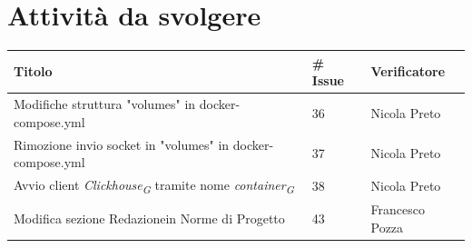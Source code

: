 \documentclass{article}
\begin{document}
\section{Attività da svolgere}
    \begin{center}
        \begin{tabular}{|C{7cm}|C{1,5cm}|C{3cm}|}
            \hline
            \textbf{Titolo} & \textbf{\# Issue} & \textbf{Verificatore} \\
            \hline\hline
            Modifiche struttura "volumes" in docker-compose.yml & 36 & Nicola Preto \\
            
            Rimozione invio socket in "volumes" in docker-compose.yml & 37 & Nicola Preto\\
            
            Avvio client \textit{Clickhouse}\textsubscript{\textit{G}} tramite nome \textit{container}\textsubscript{\textit{G}} & 38 & Nicola Preto\\
            
            Modifica sezione Redazionein Norme di Progetto & 43 & Francesco Pozza\\
            \hline
        \end{tabular}
    \end{center}
\end{document}
